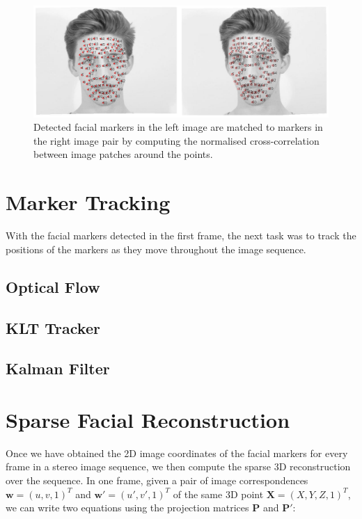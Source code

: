 \documentclass[11pt]{report}
\newcommand{\vect}[1]{\mathbf{#1}}
\begin{document}
\begin{figure}[htbp!]
\centering
\includegraphics[width=\textwidth]{img/matching}
	\caption{Detected facial markers in the left image are matched to markers in the right image pair by computing the normalised cross-correlation between image patches around the points.}
	\label{fig:matching}
\end{figure}

\section{Marker Tracking}

With the facial markers detected in the first frame, the next task was to track the positions of the markers as they move throughout the image sequence. 

\subsection{Optical Flow}

\subsection{KLT Tracker}

\cite{Shi:1994}

\subsection{Kalman Filter}

\section{Sparse Facial Reconstruction}

Once we have obtained the 2D image coordinates of the facial markers for every frame in a stereo image sequence, we then compute the sparse 3D reconstruction over the sequence. In one frame, given a pair of image correspondences $\vect{w} = (u,v,1)^T$ and $\vect{w}' = (u',v',1)^T$ of the same 3D point $\vect{X} = (X,Y,Z,1)^T$, we can write two equations using the projection matrices $\vect{P}$ and $\vect{P'}$:
\end{document}
